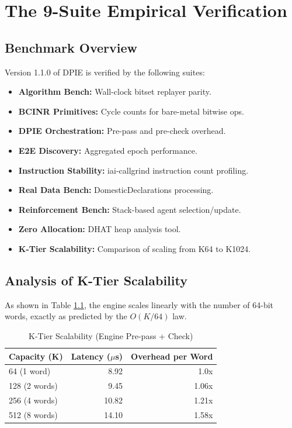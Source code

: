 \documentclass[12pt,a4paper]{report}
\begin{document}
\chapter{The 9-Suite Empirical Verification}
\section{Benchmark Overview}
Version 1.1.0 of DPIE is verified by the following suites:
\begin{itemize}
    \item \textbf{Algorithm Bench:} Wall-clock bitset replayer parity.
    \item \textbf{BCINR Primitives:} Cycle counts for bare-metal bitwise ops.
    \item \textbf{DPIE Orchestration:} Pre-pass and pre-check overhead.
    \item \textbf{E2E Discovery:} Aggregated epoch performance.
    \item \textbf{Instruction Stability:} iai-callgrind instruction count profiling.
    \item \textbf{Real Data Bench:} DomesticDeclarations processing.
    \item \textbf{Reinforcement Bench:} Stack-based agent selection/update.
    \item \textbf{Zero Allocation:} DHAT heap analysis tool.
    \item \textbf{K-Tier Scalability:} Comparison of scaling from K64 to K1024.
\end{itemize}

\section{Analysis of K-Tier Scalability}
As shown in Table \ref{tab:scalability}, the engine scales linearly with the number of 64-bit words, exactly as predicted by the $O(K/64)$ law.

\begin{table}[ht]
\centering
\caption{K-Tier Scalability (Engine Pre-pass + Check)}
\label{tab:scalability}
\begin{tabular}{lrr}
\toprule
Capacity (K) & Latency ($\mu$s) & Overhead per Word \\
\midrule
64 (1 word) & 8.92 & 1.0x \\
128 (2 words) & 9.45 & 1.06x \\
256 (4 words) & 10.82 & 1.21x \\
512 (8 words) & 14.10 & 1.58x \\
\bottomrule
\end{tabular}
\end{table}
\end{document}
